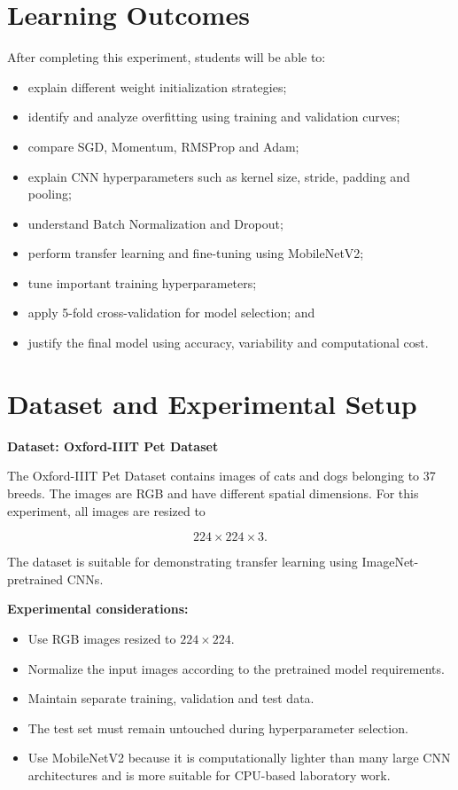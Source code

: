 \documentclass[10pt]{article}
\begin{document}
\section{Learning Outcomes}

After completing this experiment, students will be able to:

\begin{itemize}
\item explain different weight initialization strategies;
\item identify and analyze overfitting using training and validation curves;
\item compare SGD, Momentum, RMSProp and Adam;
\item explain CNN hyperparameters such as kernel size, stride, padding and pooling;
\item understand Batch Normalization and Dropout;
\item perform transfer learning and fine-tuning using MobileNetV2;
\item tune important training hyperparameters;
\item apply 5-fold cross-validation for model selection; and
\item justify the final model using accuracy, variability and computational cost.
\end{itemize}

\section{Dataset and Experimental Setup}

\textbf{Dataset: Oxford-IIIT Pet Dataset}

The Oxford-IIIT Pet Dataset contains images of cats and dogs belonging
to 37 breeds. The images are RGB and have different spatial dimensions.
For this experiment, all images are resized to

\[
224\times224\times3.
\]

The dataset is suitable for demonstrating transfer learning using
ImageNet-pretrained CNNs.

\textbf{Experimental considerations:}

\begin{itemize}
\item Use RGB images resized to $224\times224$.
\item Normalize the input images according to the pretrained model requirements.
\item Maintain separate training, validation and test data.
\item The test set must remain untouched during hyperparameter selection.
\item Use MobileNetV2 because it is computationally lighter than many
large CNN architectures and is more suitable for CPU-based laboratory work.
\end{itemize}
\end{document}
